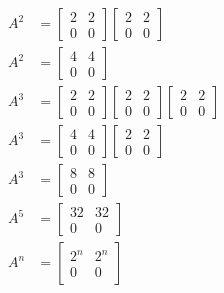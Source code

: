 \documentclass[main.tex]{subfiles}
\begin{document}
\begin{enumerate}
    $$
    \begin{aligned}
    A^{2} & = \left[\begin{array}{ll}
    2 & 2 \\
    0 & 0
    \end{array}\right]\left[\begin{array}{ll}
    2 & 2 \\
    0 & 0
    \end{array}\right] \\
    A^{2} & = \left[\begin{array}{ll}
    4 & 4 \\
    0 & 0
    \end{array}\right]\\
    A^{3} & = \left[\begin{array}{ll}
    2 & 2 \\
    0 & 0
    \end{array}\right]\left[\begin{array}{ll}
    2 & 2 \\
    0 & 0
    \end{array}\right]\left[\begin{array}{ll}
    2 & 2 \\
    0 & 0
    \end{array}\right] \\
    A^{3} & = \left[\begin{array}{ll}
    4 & 4 \\
    0 & 0
    \end{array}\right]\left[\begin{array}{ll}
    2 & 2 \\
    0 & 0
    \end{array}\right] \\
    A^{3} & = \left[\begin{array}{ll}
    8 & 8 \\
    0 & 0
    \end{array}\right]\\
    A^{5} & = \left[\begin{array}{cc}
    32 & 32 \\
    0 & 0
    \end{array}\right]\\
    A^{n} & = \left[\begin{array}{ll}
    2^{n} & 2^{n} \\
    0 & 0
    \end{array}\right]
    \end{aligned}
    $$
    

\end{enumerate}
\end{document}
